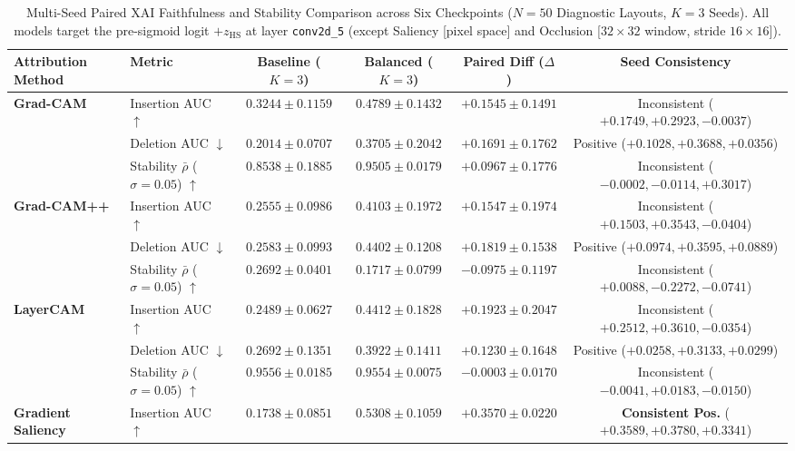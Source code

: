 \begin{table}[t]
\centering
\caption{Multi-Seed Paired XAI Faithfulness and Stability Comparison across Six Checkpoints ($N=50$ Diagnostic Layouts, $K=3$ Seeds). All models target the pre-sigmoid logit $+z_{\text{HS}}$ at layer \texttt{conv2d\_5} (except Saliency [pixel space] and Occlusion [$32\times32$ window, stride $16\times16$]).}
\label{tab:via3_xai_multiseed}
\small
\begin{tabular}{llcccc}
\hline
Attribution Method & Metric & Baseline ($K=3$) & Balanced ($K=3$) & Paired Diff ($\Delta$) & Seed Consistency \\
\hline
\textbf{Grad-CAM} & Insertion AUC $\uparrow$ & $0.3244 \pm 0.1159$ & $0.4789 \pm 0.1432$ & $+0.1545 \pm 0.1491$ & Inconsistent ($+0.1749, +0.2923, -0.0037$) \\
 & Deletion AUC $\downarrow$ & $0.2014 \pm 0.0707$ & $0.3705 \pm 0.2042$ & $+0.1691 \pm 0.1762$ & Positive ($+0.1028, +0.3688, +0.0356$) \\
 & Stability $\bar{\rho}$ ($\sigma=0.05$) $\uparrow$ & $0.8538 \pm 0.1885$ & $\mathbf{0.9505 \pm 0.0179}$ & $+0.0967 \pm 0.1776$ & Inconsistent ($-0.0002, -0.0114, +0.3017$) \\
\hline
\textbf{Grad-CAM++} & Insertion AUC $\uparrow$ & $0.2555 \pm 0.0986$ & $0.4103 \pm 0.1972$ & $+0.1547 \pm 0.1974$ & Inconsistent ($+0.1503, +0.3543, -0.0404$) \\
 & Deletion AUC $\downarrow$ & $0.2583 \pm 0.0993$ & $0.4402 \pm 0.1208$ & $+0.1819 \pm 0.1538$ & Positive ($+0.0974, +0.3595, +0.0889$) \\
 & Stability $\bar{\rho}$ ($\sigma=0.05$) $\uparrow$ & $\mathbf{0.2692 \pm 0.0401}$ & $\mathbf{0.1717 \pm 0.0799}$ & $-0.0975 \pm 0.1197$ & Inconsistent ($+0.0088, -0.2272, -0.0741$) \\
\hline
\textbf{LayerCAM} & Insertion AUC $\uparrow$ & $0.2489 \pm 0.0627$ & $0.4412 \pm 0.1828$ & $+0.1923 \pm 0.2047$ & Inconsistent ($+0.2512, +0.3610, -0.0354$) \\
 & Deletion AUC $\downarrow$ & $0.2692 \pm 0.1351$ & $0.3922 \pm 0.1411$ & $+0.1230 \pm 0.1648$ & Positive ($+0.0258, +0.3133, +0.0299$) \\
 & Stability $\bar{\rho}$ ($\sigma=0.05$) $\uparrow$ & $\mathbf{0.9556 \pm 0.0185}$ & $\mathbf{0.9554 \pm 0.0075}$ & $-0.0003 \pm 0.0170$ & Inconsistent ($-0.0041, +0.0183, -0.0150$) \\
\hline
\textbf{Gradient Saliency} & Insertion AUC $\uparrow$ & $0.1738 \pm 0.0851$ & $0.5308 \pm 0.1059$ & $+0.3570 \pm 0.0220$ & \textbf{Consistent Pos.} ($+0.3589, +0.3780, +0.3341$) \\

\end{tabular}
\end{table}
